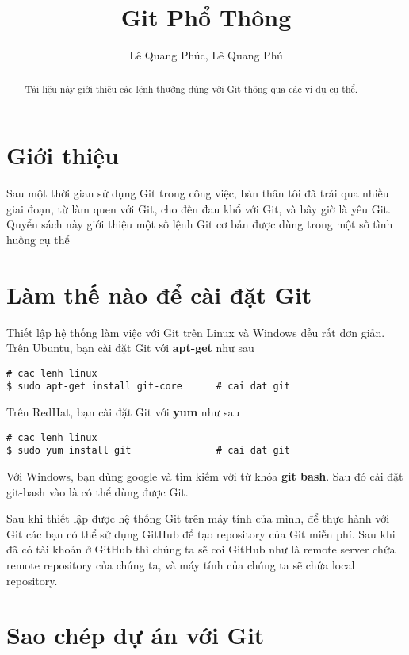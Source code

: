 \documentclass[12pt]{article}
\title{Git Phổ Thông}
\author{Lê Quang Phúc, Lê Quang Phú}
\begin{document}
\maketitle

\begin{abstract}
Tài liệu này giới thiệu các lệnh thường dùng với Git thông qua các ví dụ cụ thể.
\end{abstract}

\tableofcontents

\section{Giới thiệu}

Sau một thời gian sử dụng Git trong công việc, bản thân tôi đã trải qua nhiều giai đoạn, từ làm quen với Git, cho đến đau khổ với Git, và bây giờ là yêu Git. Quyển sách này giới thiệu một số lệnh Git cơ bản được dùng trong một số tình huống cụ thể 

\section{Làm thế nào để cài đặt Git}
Thiết lập hệ thống làm việc với Git trên Linux và Windows đều rất đơn giản.
Trên Ubuntu, bạn cài đặt Git với \textbf{apt-get} như sau

\begin{lstlisting}[label=ubuntu-installation,caption=Cài đặt Git trên Ubuntu]
# cac lenh linux
$ sudo apt-get install git-core      # cai dat git
\end{lstlisting}

Trên RedHat, bạn cài đặt Git với \textbf{yum} như sau
\begin{lstlisting}[label=redhat-installation,caption=Cài đặt Git trên Ubuntu]
# cac lenh linux
$ sudo yum install git               # cai dat git
\end{lstlisting}


Với Windows, bạn dùng google và tìm kiếm với từ khóa \textbf{git bash}. Sau đó cài đặt git-bash vào là có thể dùng được Git.

Sau khi thiết lập được hệ thống Git trên máy tính của mình, để thực hành với Git các bạn có thể sử dụng GitHub để tạo repository của Git miễn phí. Sau khi đã có tài khoản ở GitHub thì chúng ta sẽ coi GitHub như là remote server chứa remote repository của chúng ta, và máy tính của chúng ta sẽ chứa local repository.

\section{Sao chép dự án với Git}
\end{document}
